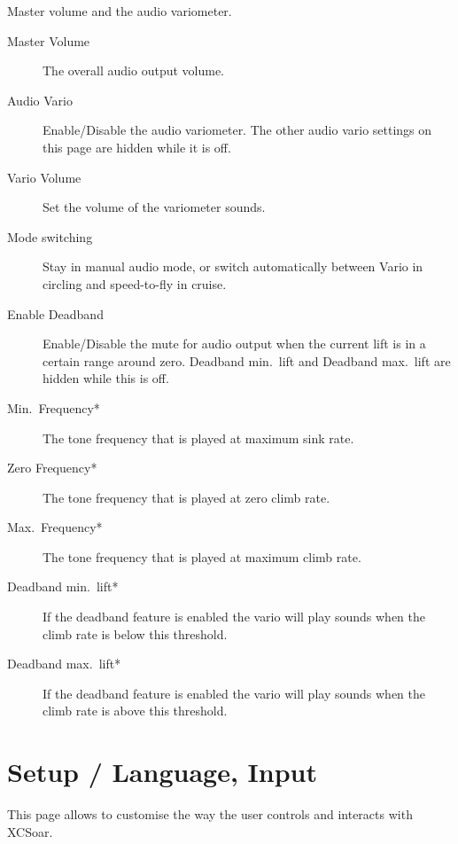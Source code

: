 Master volume and the audio variometer. \label{conf:audiovariogauge}

\begin{description}
\item[Master Volume]  The overall audio output volume.
\item[Audio Vario]  Enable/Disable the audio variometer. The other
  audio vario settings on this page are hidden while it is off.
\item[Vario Volume]  Set the volume of the variometer sounds.
\item[Mode switching]  Stay in manual audio mode, or switch automatically
  between Vario in circling and speed-to-fly in cruise.
\item[Enable Deadband]  Enable/Disable the mute for audio output when the current lift is in a certain range around zero. Deadband min.\ lift and Deadband max.\ lift are hidden while this is off.
\item[Min.\ Frequency*]  The tone frequency that is played at maximum sink rate.
\item[Zero Frequency*]  The tone frequency that is played at zero climb rate.
\item[Max.\ Frequency*]  The tone frequency that is played at maximum climb rate.
\item[Deadband min.\ lift*]  If the deadband feature is enabled the vario will play sounds when the climb rate is below this threshold.
\item[Deadband max.\ lift*]  If the deadband feature is enabled the vario will play sounds when the climb rate is above this threshold.
\end{description}


\section{Setup / Language, Input}\label{sec:interface}

This page allows to customise the way the user controls and interacts with
XCSoar.

